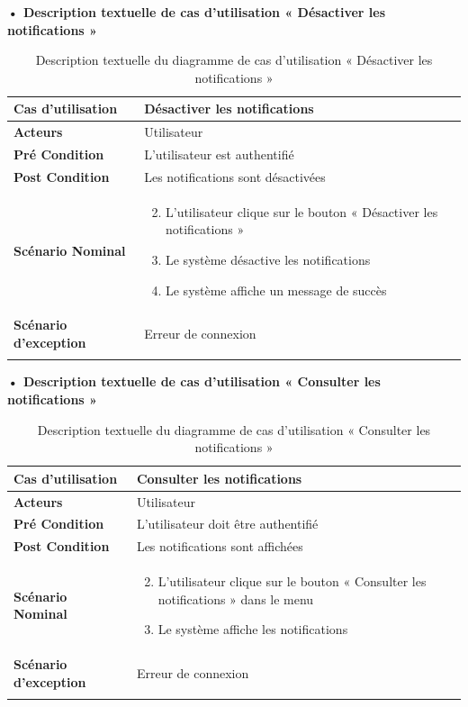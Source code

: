 \textbf{•	Description textuelle de cas d'utilisation « Désactiver les notifications »}

\begin{longtable}{|p{5cm}|p{10cm}|}
  \hline
  \textbf{Cas d'utilisation}&Désactiver les notifications\\
  \hline
  \textbf{Acteurs}&Utilisateur\\
  \hline
  \textbf{Pré Condition}&L'utilisateur est authentifié\\
  \hline
  \textbf{Post Condition}&Les notifications sont désactivées\\
  \hline
  \textbf{Scénario Nominal}&
  \vspace{-\baselineskip}
  \begin{enumerate}
    \setcounter{enumi}{1}
        \item L'utilisateur clique sur le bouton « Désactiver les notifications »
        \item Le système désactive les notifications
        \item Le système affiche un message de succès
  \end{enumerate}\\
  \hline
  \textbf{Scénario d'exception}&Erreur de connexion\\
  \hline
  \caption{Description textuelle du diagramme de cas d'utilisation « Désactiver les notifications »}
  \label{tab:use_case_desactiver_notifications}
  \end{longtable}


\textbf{•	Description textuelle de cas d'utilisation « Consulter les notifications »}

\begin{longtable}{|p{5cm}|p{10cm}|}
\hline
\textbf{Cas d'utilisation}&Consulter les notifications\\
\hline
\textbf{Acteurs}&Utilisateur \\
\hline
\textbf{Pré Condition}&L'utilisateur doit être authentifié\\
\hline
\textbf{Post Condition}&Les notifications sont affichées\\
\hline
\textbf{Scénario Nominal}&
\vspace{-\baselineskip}
\begin{enumerate}
    \setcounter{enumi}{1}
        \item L'utilisateur clique sur le bouton « Consulter les notifications » dans le menu
        \item Le système affiche les notifications
\end{enumerate}\\
\hline
\textbf{Scénario d'exception}&Erreur de connexion\\
\hline
\caption{Description textuelle du diagramme de cas d'utilisation « Consulter les notifications »}
\label{tab:use_case_consulter_notifications}
\end{longtable}

